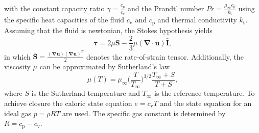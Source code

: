 \documentclass[11pt,a4paper,openany,oneside,parskip=half*]{article}
\renewcommand*\vec[1]{\boldsymbol{#1}}
\renewcommand*\matrix[1]{\boldsymbol{#1}}
\begin{document}
with the constant capacity ratio $\gamma = \frac{c_p}{c_v}$ and the Prandtl number
$ Pr = \frac{\mu_\infty c_\mathrm{p}}{k_\mathrm{t}}$
using the specific heat capacities of the fluid $ c_\mathrm{v} $ and $ c_\mathrm{p} $ and thermal conductivity $k_\mathrm{t}$.
Assuming that the fluid is newtonian, the Stokes hypothesis yields
\begin{equation}
 \matrix{\bar{\tau}} = 2 \mu \matrix{\bar{S}} - \frac{2}{3} \mu (\vec\nabla \cdot \vec{u}) \matrix{\bar{I}},
\end{equation}
in which $ \matrix{\bar{S}} = \frac{(\vec\nabla \vec{u})(\vec\nabla \vec{u})^T}{2} $ denotes the rate-of-strain tensor. Additionally, the viscosity
$ \mu $ can be approximated by Sutherland's law
\begin{equation}
 \mu (T) = \mu_\infty \biggl(\frac{T}{T_\infty}\biggl)^{3/2} \frac{T_\infty + S}{T + S},
\end{equation}
where $S$ is the Sutherland temperature and $T_\infty$ is the reference temperature.
To achieve closure the caloric state equation $ e = c_\mathrm{v} T $ and the state equation for an ideal gas $
p = \rho R T $ are used. The specific gas constant is determined by $ R = c_\mathrm{p} - c_\mathrm{v} $. 
\newline
\end{document}
